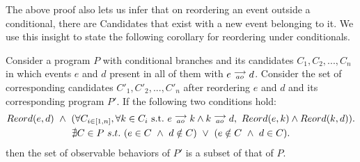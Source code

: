         The above proof also lets us infer that on reordering an event outside a conditional, there are Candidates that exist with a new event belonging to it. 
        We use this insight to state the following corollary for reordering under conditionals. 
        \begin{corollary}
            \label{ReordCond}
            Consider a program $P$ with conditional branches and its candidates $C_1, C_2, ... , C_n$ in which events $e$ and $d$ present in all of them with $e\stackrel{\longrightarrow}{_{ao}}d$. 
            Consider the set of corresponding candidates $C'_1, C'_2, ... , C'_n$ after reordering $e$ and $d$ and its corresponding program $P'$. 
            If the following two conditions hold:
            \begin{gather*}
                Reord(e,d) \ \wedge \ 
                ( \forall C_{i \in [1,n]}, \forall k \in C_i \ \text{s.t.} \ \reln{e}{ao}{k} \wedge \reln{k}{ao}{d}, \    
                Reord(e,k) \wedge Reord(k,d) ). \\
                \nexists C \in P \ s.t. \ 
                    (e \in C \ \wedge \ d \notin C) \ \vee \ 
                    (e \notin C \ \wedge \ d \in C). 
            \end{gather*}
            then the set of observable behaviors of $P'$ is a subset of that of $P$. 
        \end{corollary}

